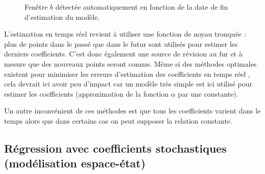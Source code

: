 \documentclass[
  a4paper,
  DIV=11,
  numbers=noendperiod,
  french]{scrartcl}
\newcommand\1{{\mathds 1}}
\theoremstyle{remark}
\begin{document}
\begin{figure}

\caption{\label{fig-oos-bw}Fenêtre \(b\) détectée automatiquement en
fonction de la date de fin d'estimation du modèle.}


\end{figure}%

L'estimation en temps réel revient à utiliser une fonction de noyau
tronquée : plus de points dans le passé que dans le futur sont utilisés
pour estimer les derniers coefficients. C'est donc également une source
de révision au fur et à mesure que des nouveaux points seront connus.
Même si des méthodes optimales existent pour minimiser les erreurs
d'estimation des coefficients en temps réel \autocite[voir par
exemple][]{FengSchafer2021}, cela devrait ici avoir peu d'impact car un
modèle très simple est ici utilisé pour estimer les coefficients
(approximation de la fonction \(\alpha\) par une constante).

Un autre inconvénient de ces méthodes est que tous les coefficients
varient dans le temps alors que dans certains cas on peut supposer la
relation constante.

\subsection{Régression avec coefficients stochastiques (modélisation
espace-état)}\label{sec-ssm}
\end{document}
